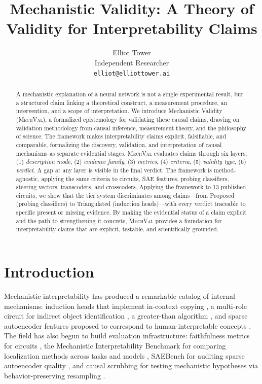 \documentclass[10pt]{article}
\title{Mechanistic Validity: A Theory of Validity for Interpretability Claims}
\author{Elliot Tower\\ Independent Researcher\\ \texttt{elliot@elliottower.ai}}
\newcommand{\mechval}{\textsc{MechVal}}
\begin{document}
\maketitle

\begin{abstract}
A mechanistic explanation of a neural network is not a single experimental result, but a structured claim linking a theoretical construct, a measurement procedure, an intervention, and a scope of interpretation. We introduce Mechanistic Validity (\mechval{}), a formalized epistemology for validating these causal claims, drawing on validation methodology from causal inference, measurement theory, and the philosophy of science. The framework makes interpretability claims explicit, falsifiable, and comparable, formalizing the discovery, validation, and interpretation of causal mechanisms as separate evidential stages. \mechval{} evaluates claims through six layers: (1) \emph{description mode}, (2) \emph{evidence family}, (3) \emph{metrics}, (4) \emph{criteria}, (5) \emph{validity type}, (6) \emph{verdict}. A gap at any layer is visible in the final verdict. The framework is method-agnostic, applying the same criteria to circuits, SAE features, probing classifiers, steering vectors, transcoders, and crosscoders. Applying the framework to 13 published circuits, we show that the tier system discriminates among claims---from Proposed (probing classifiers) to Triangulated (induction heads)---with every verdict traceable to specific present or missing evidence. By making the evidential status of a claim explicit and the path to strengthening it concrete, \mechval{} provides a foundation for interpretability claims that are explicit, testable, and scientifically grounded.
\end{abstract}

\section{Introduction}
\label{sec:intro}

Mechanistic interpretability has produced a remarkable catalog of internal mechanisms:
induction heads that implement in-context copying \citep{olsson2022context}, a multi-role
circuit for indirect object identification \citep{wang2023interpretability}, a greater-than
algorithm \citep{hanna2023greater}, and sparse autoencoder features proposed to correspond
to human-interpretable concepts \citep{cunningham2023sparse, bricken2024monosemanticity}. The field has also begun to
build evaluation infrastructure: faithfulness metrics for circuits
\citep{miller2024transformer}, the Mechanistic Interpretability Benchmark for comparing
localization methods across tasks and models \citep{mueller2025mib}, SAEBench for auditing
sparse autoencoder quality \citep{karvonen2025saebench}, and causal scrubbing for testing
mechanistic hypotheses via behavior-preserving resampling \citep{chan2022causal}.
\end{document}
